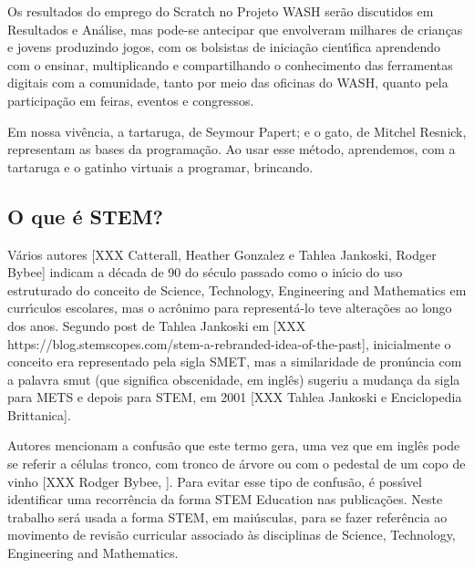 \documentclass[
12pt,		%
openright,	%
twoside,  %
a4paper,			%
chapter=TITLE,		%
english,			%
french,				%
spanish,			%
brazil				%
]{USPSC-classe/USPSC}
\begin{document}
Os resultados do emprego do Scratch no Projeto WASH ser\~ao discutidos em Resultados e An\'alise, mas pode-se antecipar que envolveram milhares de crian\c{c}as e jovens produzindo jogos, com os bolsistas de inicia\c{c}\~ao cient\'{\i}fica aprendendo com o ensinar, multiplicando e compartilhando o conhecimento das ferramentas digitais  com a comunidade, tanto por meio das oficinas do WASH, quanto pela participa\c{c}\~ao em feiras, eventos e congressos.










Em nossa viv\^encia, a tartaruga, de Seymour Papert; e o gato, de Mitchel Resnick,  representam as bases da  programa\c{c}\~ao. Ao usar esse m\'etodo, aprendemos, com a tartaruga e o gatinho virtuais a  programar,  brincando.










\subsection[O que \'e STEM?]{O que \'e STEM?}\label{O que \'e STEM?}
V\'arios autores [XXX Catterall, Heather Gonzalez e  Tahlea Jankoski, Rodger Bybee] indicam a d\'ecada de 90 do s\'eculo passado como o in\'{\i}cio do uso estruturado do conceito de Science, Technology, Engineering and Mathematics em curr\'{\i}culos escolares, mas o acr\^onimo para represent\'a-lo teve altera\c{c}\~oes ao longo dos anos. Segundo post de Tahlea Jankoski em [XXX https://blog.stemscopes.com/stem-a-rebranded-idea-of-the-past], inicialmente o conceito era representado pela sigla SMET, mas a similaridade de pron\'uncia com a palavra \textquotedbl smut (que significa obscenidade, em ingl\^es) sugeriu a mudan\c{c}a da sigla para METS e depois para STEM, em 2001 [XXX Tahlea Jankoski e Enciclopedia Brittanica]. 










Autores mencionam a confus\~ao que este termo gera, uma vez que em ingl\^es pode se referir a c\'elulas tronco, com tronco de \'arvore ou com o pedestal de um copo de vinho [XXX Rodger Bybee, ]. Para evitar esse tipo de confus\~ao, \'e poss\'{\i}vel identificar uma recorr\^encia da forma \textquotedbl STEM Education nas publica\c{c}\~oes. Neste trabalho ser\'a usada a forma STEM, em mai\'usculas, para se fazer refer\^encia ao movimento de revis\~ao curricular associado \`as disciplinas de \textquotedbl Science, Technology, Engineering and Mathematics.  
\end{document}
